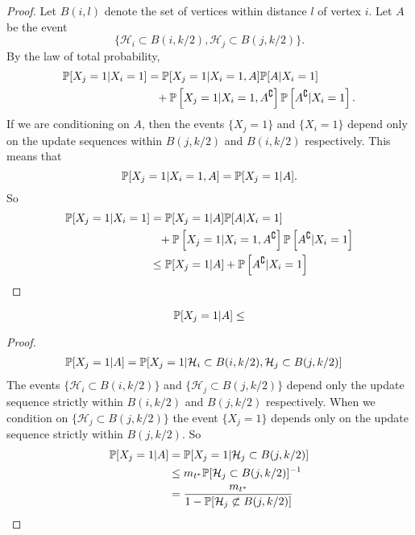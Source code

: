 \begin{proof}
	Let $B(i, l)$ denote the set of vertices within distance $l$ of vertex $i$. Let $A$ be the event
	\begin{equation}
		\{\mathcal{H}_i \subset B(i,k/2), \mathcal{H}_j \subset B(j, k/2)\}.
	\end{equation}
	By the law of total probability,
	\begin{align}
		\mathbb{P}[X_j = 1 | X_i = 1] &= \mathbb{P}[X_j = 1 | X_i = 1, A] \mathbb{P}[A|X_i = 1] \notag \\ 
		&\phantom{=}  +\mathbb{P}\left[X_j = 1 | X_i = 1, A^\complement\right] \mathbb{P}\left[A^\complement|X_i = 1\right].
	\end{align}
	If we are conditioning on $A$, then the events $\{X_j = 1\}$ and $\{X_i = 1\}$ depend only on the update sequences within $B(j, k/2)$ and $B(i, k/2)$ respectively. This means that
	\begin{equation}
		\mathbb{P}[X_j = 1 | X_i = 1, A] = \mathbb{P}[X_j = 1 | A].
	\end{equation}
	So
	\begin{align}
		\mathbb{P}[X_j = 1 | X_i = 1] &= \mathbb{P}[X_j = 1 | A] \mathbb{P}[A|X_i = 1] \notag \\ 
		&\phantom{=}  +\mathbb{P}\left[X_j = 1 | X_i = 1, A^\complement\right] \mathbb{P}\left[A^\complement|X_i = 1\right]\\
		&\leq \mathbb{P}[X_j = 1 | A] + \mathbb{P}\left[A^\complement | X_i = 1\right]
	\end{align}
\end{proof}
\begin{lemma}
	\begin{equation}
		\mathbb{P}[X_j = 1 | A] \leq 
	\end{equation}
\end{lemma}
\begin{proof}
	\begin{align}
		\prob[X_j = 1 | A] &= \prob[X_j = 1 | \mathcal{H}_i \subset B(i, k/2), \mathcal{H}_j \subset B(j, k/2)]%
	\end{align}
	The events $\{\mathcal{H}_i \subset B(i, k/2)\}$ and $\{\mathcal{H}_j \subset B(j, k/2)\}$ depend only the update sequence strictly within $B(i, k/2)$ and $B(j, k/2)$ respectively. When we condition on $\{\mathcal{H}_j \subset B(j, k/2)\}$ the event $\{X_j = 1\}$ depends only on the update sequence strictly within $B(j, k/2)$. So
	\begin{align}
		\mathbb{P}[X_j = 1 | A] &= \mathbb{P}[X_j = 1 | \mathcal{H}_j \subset B(j, k/2)]\\
			&\leq m_{t^*} \mathbb{P}[\mathcal{H}_j \subset B(j, k/2)]^{-1}\\
			&= \frac{m_{t^*}}{1 - \mathbb{P}[\mathcal{H}_j \not\subset B(j, k/2)]}
	\end{align}

\end{proof}
